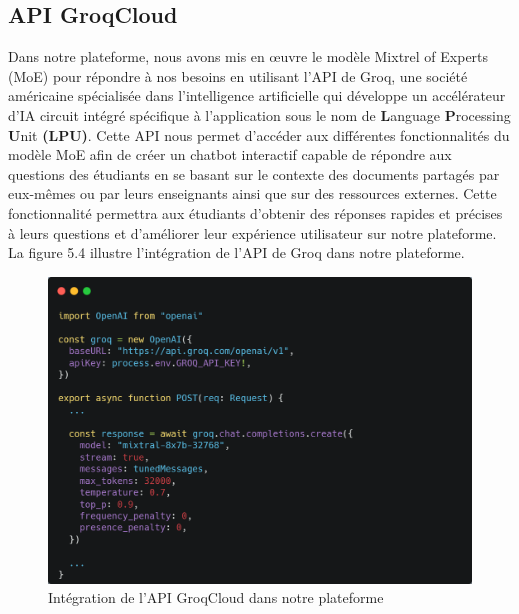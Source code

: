 \subsection{API GroqCloud}
Dans notre plateforme, nous avons mis en œuvre le modèle Mixtrel of Experts (MoE) pour répondre à nos besoins en utilisant l'API de Groq, une société américaine spécialisée dans l'intelligence artificielle qui développe un accélérateur d'IA circuit intégré spécifique à l'application sous le nom de \textbf{L}anguage \textbf{P}rocessing \textbf{U}nit \textbf{(LPU)}. Cette API nous permet d'accéder aux différentes fonctionnalités du modèle MoE afin de créer un chatbot interactif capable de répondre aux questions des étudiants en se basant sur le contexte des documents partagés par eux-mêmes ou par leurs enseignants ainsi que sur des ressources externes. Cette fonctionnalité permettra aux étudiants d'obtenir des réponses rapides et précises à leurs questions et d'améliorer leur expérience utilisateur sur notre plateforme.\\
La figure 5.4 illustre l'intégration de l'API de Groq dans notre plateforme.
\begin{figure}[H]
    \centering
    \includegraphics[width=\textwidth]{images/chp5/fig4.png}
    \caption{Intégration de l'API GroqCloud dans notre plateforme}
    \label{fig:Integration de l'API GroqCloud dans notre plateforme}    
\end{figure}
